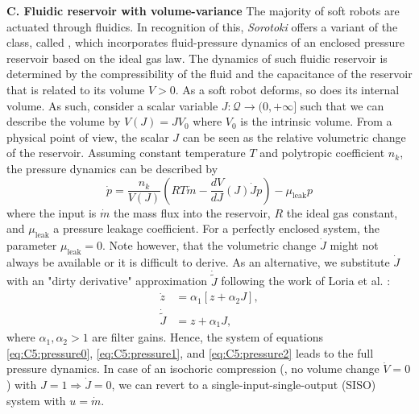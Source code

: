 \textbf{C. Fluidic reservoir with volume-variance}
The majority of soft robots are actuated through fluidics. In recognition of this, \textit{Sorotoki} offers a variant of the  class, called , which incorporates fluid-pressure dynamics of an enclosed pressure reservoir based on the ideal gas law. The dynamics of such fluidic reservoir is determined by the compressibility of the fluid and the capacitance of the reservoir that is related to its volume $V > 0$. As a soft robot deforms, so does its internal volume. As such, consider a scalar variable $J: \mathcal{Q} \to (0,+\infty]$ such that we can describe the volume by $V(J) = J V_0$ where $V_0$ is the intrinsic volume. From a physical point of view, the scalar $J$ can be seen as the relative volumetric change of the reservoir. Assuming constant temperature $T$ and polytropic coefficient $n_k$, the pressure dynamics can be described by
%
\begin{equation}
    \dot{p} = \frac{n_k}{V(J)} \left( R T \dot{m} - \frac{d V}{d J}(J) \dot{J} p \right) - \mu_{\textrm{leak}} p
    \label{eq:C5:pressure0}
\end{equation}
%
where the input is $\dot{m}$ the mass flux into the reservoir, $R$ the ideal gas constant, and $\mu_{\textrm{leak}}$ a pressure leakage coefficient. For a perfectly enclosed system, the parameter $\mu_{\textrm{leak}} = 0$. Note however, that the volumetric change $\dot{J}$ might not always be available or it is difficult to derive. As an alternative, we substitute $\dot{J}$ with an "dirty derivative" approximation $\dot{\tilde{J}}$ following the work of Loria et al. \cite{Loria2015Jun}:
%
\begin{align}
    \dot{z}         & = \alpha_1 [z + \alpha_2 J ], \label{eq:C5:pressure1}\\
    \dot{\tilde{J}} & = z + \alpha_1 J, \label{eq:C5:pressure2}
\end{align}
%
where $\alpha_1,\alpha_2> 1$ are filter gains. Hence, the system of equations \eqref{eq:C5:pressure0}, \eqref{eq:C5:pressure1}, and \eqref{eq:C5:pressure2} leads to the full pressure dynamics. In case of an isochoric compression (\ie, no volume change $\dot{V} = 0$) with $J = 1 \Rightarrow \dot{J} = 0$, we can revert to a single-input-single-output (SISO) system with $u = \dot{m}$.

